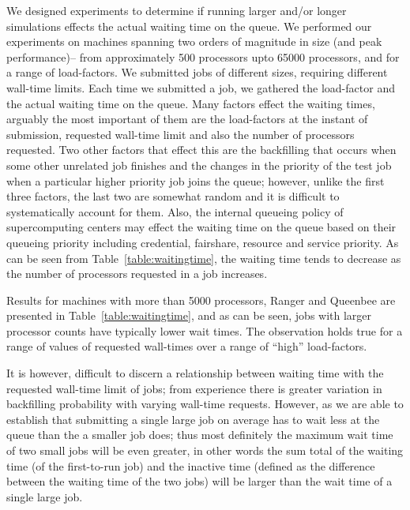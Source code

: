 \documentclass[conference,final]{IEEEtran}
\begin{document}
We designed experiments to determine if running larger and/or longer
simulations effects the actual waiting time on the queue. We performed
our experiments on machines spanning two orders of magnitude in size
(and peak performance)-- from approximately 500 processors upto 65000
processors, and for a range of load-factors.  We submitted jobs of
different sizes, requiring different wall-time limits. Each time we
submitted a job, we gathered the load-factor and the actual waiting
time on the queue. Many factors effect the waiting times, arguably the
most important of them are the load-factors at the instant of
submission, requested wall-time limit and also the number of
processors requested. Two other factors that effect this are the
backfilling that occurs when some other unrelated job finishes and the
changes in the priority of the test job when a particular higher
priority job joins the queue; however, unlike the first three factors,
the last two are somewhat random and it is difficult to systematically
account for them. Also, the internal queueing policy of supercomputing
centers may effect the waiting time on the queue based on their
queueing priority including credential, fairshare, resource and
service priority.  As can be seen from Table~\ref{table:waitingtime},
the waiting time tends to decrease as the number of processors
requested in a job increases.



Results for machines with more than 5000 processors, Ranger and
Queenbee are presented in Table~\ref{table:waitingtime}, and as can be
seen, jobs with larger processor counts have typically lower wait
times. The observation holds true for a range of values of requested
wall-times over a range of ``high'' load-factors.


It is however, difficult to discern a relationship between waiting
time with the requested wall-time limit of jobs; from experience there
is greater variation in backfilling probability with varying wall-time
requests.  However, as we are able to establish that submitting a
single large job on average has to wait less at the queue than the a
smaller job does; thus most definitely the maximum wait time of two
small jobs will be even greater, in other words the sum total of the
waiting time (of the first-to-run job) and the inactive time (defined
as the difference between the waiting time of the two jobs) will be
larger than the wait time of a single large job.
\end{document}
